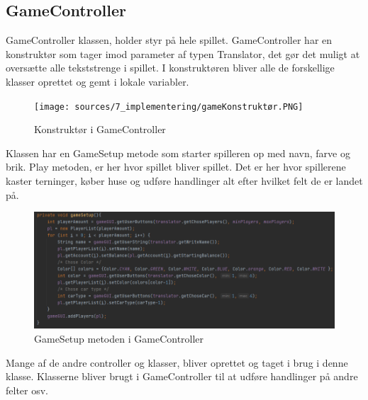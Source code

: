 \subsection{GameController}
GameController klassen, holder styr på hele spillet. GameController har en konstruktør som tager imod parameter af typen Translator, det gør det muligt at oversætte alle tekststrenge i spillet. I konstruktøren bliver alle de forskellige klasser oprettet og gemt i lokale variabler.

\begin{figure}[H]
    \centering
    \texttt{[image: sources/7\_implementering/gameKonstruktør.PNG]}
    \caption{Konstruktør i GameController}
    \label{fig:KSGC}
\end{figure}

Klassen har en GameSetup metode som starter spilleren op med navn, farve og brik. Play metoden, er her hvor spillet bliver spillet. Det er her hvor spillerene kaster terninger, køber huse og udføre handlinger alt efter hvilket felt de er landet på. 

\begin{figure}[H]
    \centering
    \includegraphics[width=\textwidth]{sources/7_implementering/gamesetup.PNG}
    \caption{GameSetup metoden i GameController}
    \label{fig:GS}
\end{figure}

Mange af de andre controller og klasser, bliver oprettet og taget i brug i denne klasse. Klasserne bliver brugt i GameController til at udføre handlinger på andre felter osv.